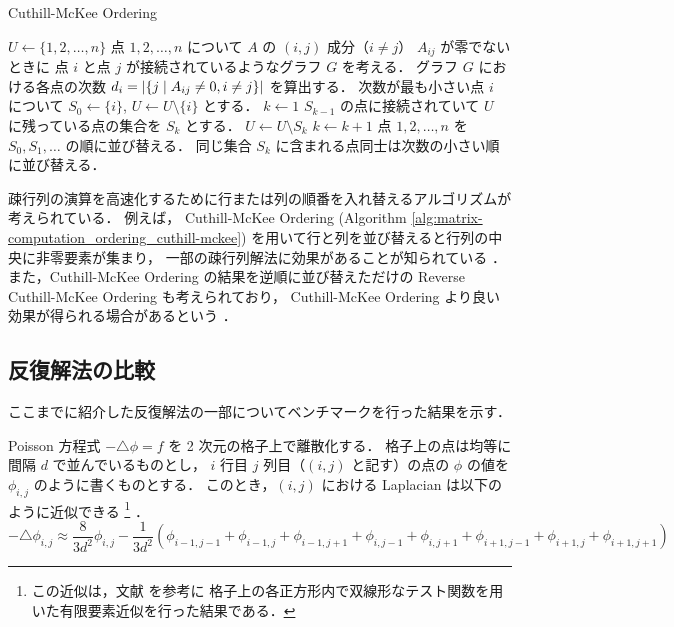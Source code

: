 \begin{algorithm}[tp]
    \caption{Cuthill-McKee Ordering \cite{Golub2013,Knabner2003}}
    \label{alg:matrix-computation_ordering_cuthill-mckee}
    \begin{algorithmic}[1]
        \State $U \gets \{1, 2, \ldots, n\}$
        \State 点 $1, 2, \ldots, n$ について
        $A$ の $(i, j)$ 成分（$i \neq j$） $A_{ij}$ が零でないときに
        点 $i$ と点 $j$ が接続されているようなグラフ $G$ を考える．
        \State グラフ $G$ における各点の次数
        $d_i = \left| \left\{ j \mathrel{}\middle|\mathrel{} A_{ij} \neq 0, i \neq j \right\} \right|$
        を算出する．
        \State 次数が最も小さい点 $i$ について
        $S_0 \gets \{ i \}$,
        $U \gets U \setminus \{ i \}$
        とする．
        \State $k \gets 1$
        \State $S_{k - 1}$ の点に接続されていて $U$ に残っている点の集合を $S_k$ とする．
        \State $U \gets U \setminus S_k$
        \State $k \gets k + 1$
        \EndWhile
        \State 点 $1, 2, \ldots, n$ を $S_0, S_1, \ldots$ の順に並び替える．
        同じ集合 $S_k$ に含まれる点同士は次数の小さい順に並び替える．
        \EndProcedure
    \end{algorithmic}
\end{algorithm}

疎行列の演算を高速化するために行または列の順番を入れ替えるアルゴリズムが考えられている．
例えば，
Cuthill-McKee Ordering (Algorithm \ref{alg:matrix-computation_ordering_cuthill-mckee})
を用いて行と列を並び替えると行列の中央に非零要素が集まり，
一部の疎行列解法に効果があることが知られている
\cite{Golub2013,Knabner2003}．
また，Cuthill-McKee Ordering の結果を逆順に並び替えただけの
Reverse Cuthill-McKee Ordering も考えられており，
Cuthill-McKee Ordering より良い効果が得られる場合があるという
\cite{Golub2013,Knabner2003}．

\subsection{反復解法の比較}

ここまでに紹介した反復解法の一部についてベンチマークを行った結果を示す．

Poisson 方程式 $-\triangle\phi = f$ を 2 次元の格子上で離散化する．
格子上の点は均等に間隔 $d$ で並んでいるものとし，
$i$ 行目 $j$ 列目（$(i, j)$ と記す）の点の $\phi$ の値を $\phi_{i,j}$ のように書くものとする．
このとき，$(i, j)$ における Laplacian は以下のように近似できる
\footnote{この近似は，文献 \cite{Knabner2003} を参考に%
    格子上の各正方形内で双線形なテスト関数を用いた有限要素近似を行った結果である．}
．
\begin{equation}
    -\triangle \phi_{i,j} \approx
    \frac{8}{3d^2} \phi_{i,j} - \frac{1}{3d^2} \left(
    \phi_{i-1,j-1} + \phi_{i-1,j} + \phi_{i-1,j+1}
    + \phi_{i,j-1} + \phi_{i,j+1}
    + \phi_{i+1,j-1} + \phi_{i+1,j} + \phi_{i+1,j+1}
    \right)
\end{equation}

